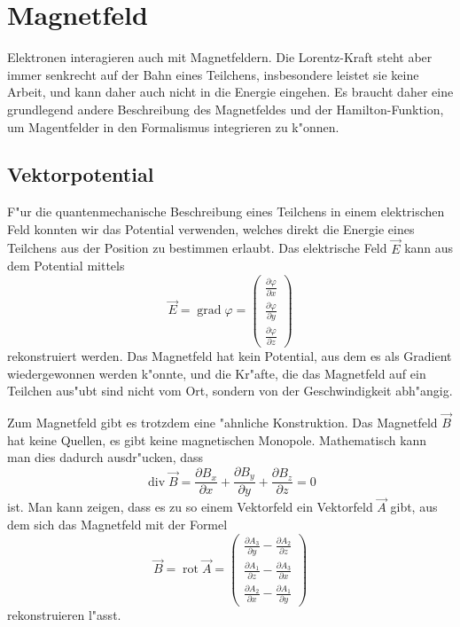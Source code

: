 \chapter{Magnetfeld}
\rhead{}
Elektronen interagieren auch mit Magnetfeldern. Die Lorentz-Kraft
steht aber immer senkrecht auf der Bahn eines Teilchens, insbesondere
leistet sie keine Arbeit, und kann daher auch nicht in die Energie
eingehen.
Es braucht daher eine grundlegend andere Beschreibung des Magnetfeldes
und der Hamilton-Funktion, um Magentfelder in den Formalismus
integrieren zu k"onnen.

\section{Vektorpotential}
F"ur die quantenmechanische Beschreibung eines Teilchens in einem
elektrischen Feld konnten wir das Potential verwenden, welches
direkt die Energie eines Teilchens aus der Position zu bestimmen
erlaubt. 
Das elektrische Feld $\vec E$ kann aus dem Potential mittels
\[
\vec E=\operatorname{grad}\varphi
=
\begin{pmatrix}
\frac{\partial\varphi}{\partial x}\\
\frac{\partial\varphi}{\partial y}\\
\frac{\partial\varphi}{\partial z}
\end{pmatrix}
\]
rekonstruiert werden.
Das Magnetfeld hat kein Potential, aus dem es als Gradient wiedergewonnen
werden k"onnte, und die Kr"afte, die das Magnetfeld
auf ein Teilchen aus"ubt sind nicht vom Ort, sondern von der Geschwindigkeit
abh"angig.

Zum Magnetfeld gibt es trotzdem eine "ahnliche Konstruktion.
Das Magnetfeld $\vec B$ hat keine Quellen, es gibt keine magnetischen
Monopole.
Mathematisch kann man dies dadurch ausdr"ucken, dass 
\[
\operatorname{div}\vec B
=
\frac{\partial B_x}{\partial x}
+
\frac{\partial B_y}{\partial y}
+
\frac{\partial B_z}{\partial z}
=0
\]
ist.
Man kann zeigen, dass es zu so einem Vektorfeld ein Vektorfeld $\vec A$
gibt, aus dem sich das Magnetfeld mit der Formel
\[
\vec B=\operatorname{rot}\vec A
=\begin{pmatrix}
\frac{\partial A_3}{\partial y}-\frac{\partial A_2}{\partial z}\\
\frac{\partial A_1}{\partial z}-\frac{\partial A_3}{\partial x}\\
\frac{\partial A_2}{\partial x}-\frac{\partial A_1}{\partial y}
\end{pmatrix}
\]
rekonstruieren l"asst.

